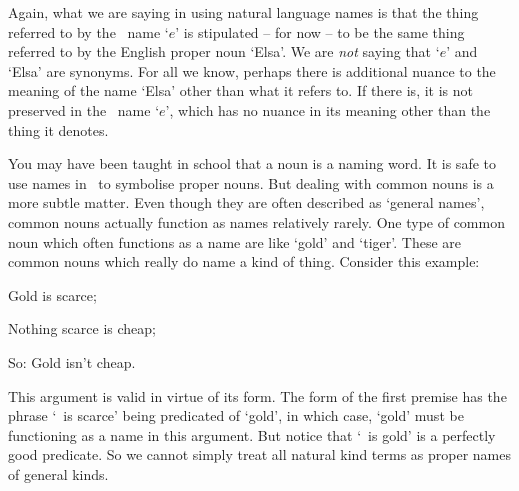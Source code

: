 Again, what we are saying in using natural language names is that the thing referred to by the \FOL\ name `$e$' is stipulated – for now – to be the same thing referred to by the English proper noun `Elsa'. We are \emph{not} saying that `$e$' and `Elsa' are synonyms. For all we know, perhaps there is additional nuance to the meaning of the name `Elsa' other than what it refers to. If there is, it is not preserved in the \FOL\ name `$e$', which has no nuance in its meaning other than the thing it denotes.

You may have been taught in school that a noun is a naming word. It is safe to use names in \FOL\ to symbolise proper nouns. But dealing with common nouns  is a more subtle matter. Even though they are often described as `general names', common nouns actually function as names relatively rarely. One type of common noun which often functions as a name are  like `gold' and `tiger'. These are common nouns which really do name a kind of thing. Consider this example: \begin{earg}
	\item[] Gold is scarce;
	\item[] Nothing scarce is cheap;
	\item[So:] Gold isn't cheap.
\end{earg} This argument is valid in virtue of its form. The form of the first premise has the phrase `\blank\ is scarce' being predicated of `gold', in which case, `gold' must be functioning as a name in this argument. But notice that `\blank\ is gold' is a perfectly good predicate. So we cannot simply treat all natural kind terms as proper names of general kinds.  

